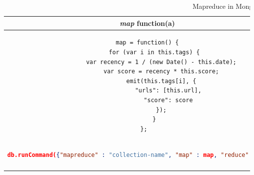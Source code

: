 \begin{longtable}{c|c}
	{\textit{map}} function(a) & {\textit{reduce}} function(b)\\
	\hline
	\begin{minipage}{.4\textwidth}
		\centering		
		\begin{lstlisting}[language=XML,basicstyle = \scriptsize,label=couchbase-map-sample]
map = function() {
	for (var i in this.tags) {
		var recency = 1 / (new Date() - this.date);
		var score = recency * this.score;
		emit(this.tags[i], {
			"urls": [this.url],
			"score": score
		});
	}
};	
		\end{lstlisting}		
	\end{minipage} &
	\begin{minipage}{.55\textwidth}
		\centering
		\begin{lstlisting}[language=JSON, basicstyle =\scriptsize, label=couchbase-reduce-sample]
reduce = function(key, emits) {
	var total = {urls: [],score: 0 }
	for (var i in emits) {
		emits[i].urls.forEach(function(url) {
			total.urls.push(url);
		}
		total.score += emits[i].score;
	}
	return total;
};
		\end{lstlisting}
	\end{minipage}\\
	\hline
	\begin{minipage}{.55\textwidth}
	\begin{lstlisting}[language=JSON, basicstyle =\scriptsize,]
        db.runCommand({"mapreduce" : "collection-name", "map" : map, "reduce" : reduce})
    \end{lstlisting}
	\end{minipage}\\
	\caption{Mapreduce in MongoDB}
	\label{mongdb-mapreduce}\\
\end{longtable}


